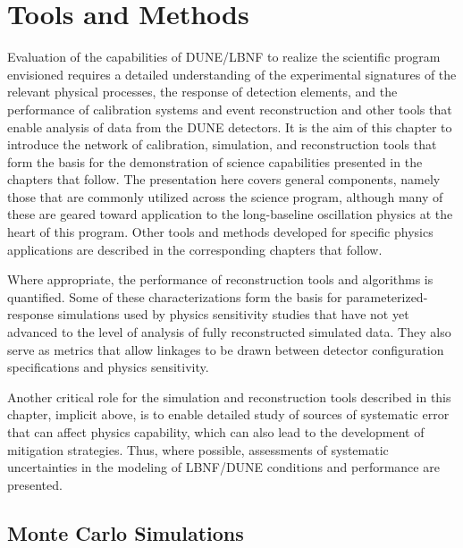 \chapter{Tools and Methods}
\label{ch:tools}

Evaluation of the capabilities of DUNE/LBNF to realize the scientific program envisioned requires a detailed understanding of the experimental signatures of the relevant physical processes, the response of detection elements, and the performance of calibration systems and event reconstruction and other tools that enable analysis of data from the DUNE detectors.  It is the aim of this chapter to introduce the network of calibration, simulation, and reconstruction tools that form the basis for the demonstration of science capabilities presented in the chapters that follow.  The presentation here covers general components, namely those that are commonly utilized across the science program, although many of these are geared toward application to the long-baseline oscillation physics at the heart of this program.  Other tools and methods developed for specific physics applications are described in the corresponding chapters that follow.

Where appropriate, the performance of reconstruction tools and algorithms is quantified.  Some of these characterizations form the basis for parameterized-response simulations used by physics sensitivity studies that have not yet advanced to the level of analysis of fully reconstructed simulated data.  They also serve as metrics that allow linkages to be drawn between detector configuration specifications and physics sensitivity.

Another critical role for the simulation and reconstruction tools described in this chapter, implicit above, is to enable detailed study of sources of systematic error that can affect physics capability, which can also lead to the development of mitigation strategies.  Thus, where possible, assessments of systematic uncertainties in the modeling of LBNF/DUNE conditions and performance are presented.


\section{Monte Carlo Simulations}
\label{sec:tools-mc}


